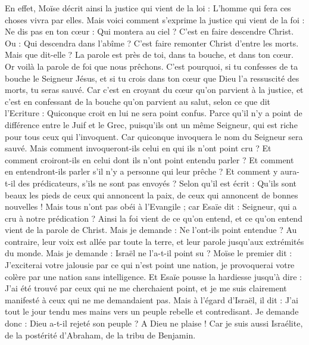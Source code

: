 \begin{multicols}{2}
En effet, Moïse décrit ainsi la justice qui vient de la loi : L'homme qui fera ces choses vivra par elles.
Mais voici comment s'exprime la justice qui vient de la foi : Ne dis pas en ton cœur : Qui montera au ciel ? C'est en faire descendre Christ.
Ou : Qui descendra dans l'abîme ? C'est faire remonter Christ d'entre les morts.
Mais que dit-elle ? La parole est près de toi, dans ta bouche, et dans ton cœur. Or voilà la parole de foi que nous prêchons.
C'est pourquoi, si tu confesses de ta bouche le Seigneur Jésus, et si tu crois dans ton cœur que Dieu l'a ressuscité des morts, tu seras sauvé.
Car c'est en croyant du cœur qu'on parvient à la justice, et c'est en confessant de la bouche qu'on parvient au salut, selon ce que dit l'Ecriture :
Quiconque croit en lui ne sera point confus.
Parce qu'il n'y a point de différence entre le Juif et le Grec, puisqu'ils ont un même Seigneur, qui est riche pour tous ceux qui l'invoquent.
Car quiconque invoquera le nom du Seigneur sera sauvé.
Mais comment invoqueront-ils celui en qui ils n'ont point cru ? Et comment croiront-ils en celui dont ils n'ont point entendu parler ? Et comment en entendront-ils parler s'il n'y a personne qui leur prêche ?
Et comment y aura-t-il des prédicateurs, s'ils ne sont pas envoyés ? Selon qu'il est écrit : Qu'ils sont beaux les pieds de ceux qui annoncent la paix, de ceux qui annoncent de bonnes nouvelles !
Mais tous n'ont pas obéi à l'Evangile ; car Esaïe dit : Seigneur, qui a cru à notre prédication ?
Ainsi la foi vient de ce qu'on entend, et ce qu'on entend vient de la parole de Christ.
Mais je demande : Ne l'ont-ils point entendue ? Au contraire, leur voix est allée par toute la terre, et leur parole jusqu'aux extrémités du monde.
Mais je demande : Israël ne l'a-t-il point su ? Moïse le premier dit : J'exciterai votre jalousie par ce qui n'est point une nation, je provoquerai votre colère par une nation sans intelligence.
Et Esaïe pousse la hardiesse jusqu'à dire : J'ai été trouvé par ceux qui ne me cherchaient point, et je me suis clairement manifesté à ceux qui ne me demandaient pas.
Mais à l'égard d'Israël, il dit : J'ai tout le jour tendu mes mains vers un peuple rebelle et contredisant.
\VerseOne{}Je demande donc : Dieu a-t-il rejeté son peuple ? A Dieu ne plaise ! Car je suis aussi Israélite, de la postérité d'Abraham, de la tribu de Benjamin.

\end{multicols}
